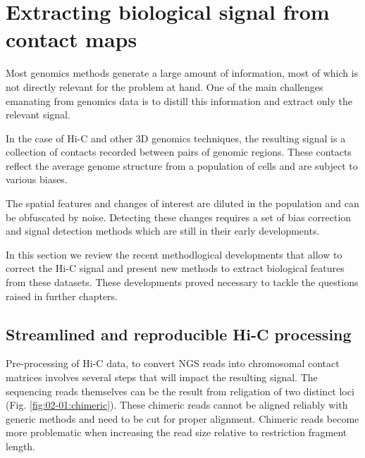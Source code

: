 
\chapter{Extracting biological signal from contact maps} %

\label{ch:02-01} %


Most genomics methods generate a large amount of information, most of which is not directly relevant for the problem at hand. One of the main challenges emanating from genomics data is to distill this information and extract only the relevant signal.

In the case of Hi-C and other 3D genomics techniques, the resulting signal is a collection of contacts recorded between pairs of genomic regions. These contacts reflect the average genome structure from a population of cells and are subject to various biases.

The spatial features and changes of interest are diluted in the population and can be obfuscated by noise. Detecting these changes requires a set of bias correction and signal detection methods which are still in their early developments.

In this section we review the recent methodlogical developments that allow to correct the Hi-C signal and present new methods to extract biological features from these datasets. These developments proved necessary to tackle the questions raised in further chapters.

\section{Streamlined and reproducible Hi-C processing}
\label{sec:02-01:streamlined-processing}

Pre-processing of Hi-C data, to convert \acrfull{NGS} reads into chromosomal contact matrices involves several steps that will impact the resulting signal. The sequencing reads themselves can be the result from religation of two distinct loci (Fig. \ref{fig:02-01:chimeric}). These chimeric reads cannot be aligned reliably with generic methods and need to be cut for proper alignment. Chimeric reads become more problematic when increasing the read size relative to restriction fragment length.

